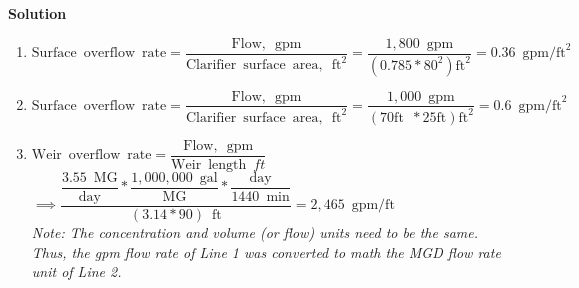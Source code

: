 \textbf{Solution}
\begin{enumerate}
\item $\mathrm{Surface \enspace overflow \enspace rate}=\dfrac{\mathrm{Flow, \enspace gpm}}{\mathrm{Clarifier \enspace surface \enspace area, \enspace ft}^2}=\dfrac{1,800 \enspace \mathrm{gpm}}{(0.785*80^2 )\mathrm{ft}^2}=\boxed{0.36 \enspace \mathrm{gpm/ft}^2}$

\vspace{0.2cm}
\item $\mathrm{Surface \enspace overflow \enspace rate}=\dfrac{\mathrm{Flow, \enspace gpm}}{\mathrm{Clarifier \enspace surface \enspace area, \enspace ft}^2}=\dfrac{1,000 \enspace \mathrm{gpm}}{(70 \mathrm{ft} \enspace * 25 \mathrm{ft})\mathrm{ft}^2}=\boxed{0.6 \enspace \mathrm{gpm/ft}^2}$

\vspace{0.2cm}
\item $\mathrm{Weir \enspace overflow \enspace rate}=\dfrac{\mathrm{Flow, \enspace gpm}}{\mathrm{Weir} \enspace \mathrm{length} \enspace ft}$\\
\vspace{0.3cm}
$\implies \dfrac{ \dfrac{3.55 \enspace \mathrm{MG}}{\mathrm{day}}*\dfrac{1,000,000 \enspace \mathrm{gal}}{\mathrm{MG}}*\dfrac{\mathrm{day}}{1440 \enspace \mathrm{min}}}{ (3.14*90) \enspace \mathrm{ft}}=\boxed{2,465 \enspace  \mathrm{gpm/ft}}$\\
\vspace{0.3cm}
\textit{Note: The concentration and volume (or flow) units need to be the same.  Thus, the gpm flow rate of Line 1 was converted to math the MGD flow rate unit of Line 2.}


\end{enumerate}




